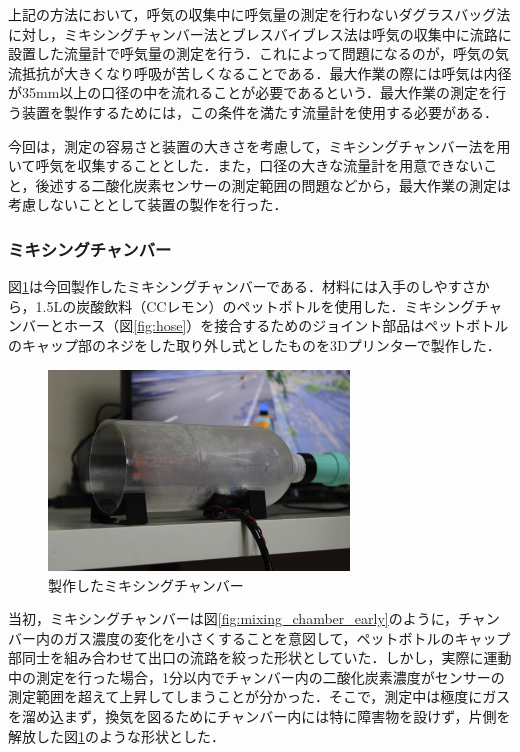 上記の方法において，呼気の収集中に呼気量の測定を行わないダグラスバッグ法に対し，ミキシングチャンバー法とブレスバイブレス法は呼気の収集中に流路に設置した流量計で呼気量の測定を行う．これによって問題になるのが，呼気の気流抵抗が大きくなり呼吸が苦しくなることである．最大作業の際には呼気は内径が35mm以上の口径の中を流れることが必要であるという\cite{science_of_vo2}．最大作業の測定を行う装置を製作するためには，この条件を満たす流量計を使用する必要がある．

今回は，測定の容易さと装置の大きさを考慮して，ミキシングチャンバー法を用いて呼気を収集することとした．また，口径の大きな流量計を用意できないこと，後述する二酸化炭素センサーの測定範囲の問題などから，最大作業の測定は考慮しないこととして装置の製作を行った．

\subsubsection{ミキシングチャンバー}

図\ref{fig:mixing_chamber}は今回製作したミキシングチャンバーである．材料には入手のしやすさから，1.5Lの炭酸飲料（CCレモン）のペットボトルを使用した．ミキシングチャンバーとホース（図\ref{fig:hose}）を接合するためのジョイント部品はペットボトルのキャップ部のネジをした取り外し式としたものを3Dプリンターで製作した．

\begin{figure}[H]
  \begin{center}
    \includegraphics[width=8cm]{fig/mixing_chamber}
    \caption{製作したミキシングチャンバー}
    \label{fig:mixing_chamber}
  \end{center}
\end{figure}

当初，ミキシングチャンバーは図\ref{fig:mixing_chamber_early}のように，チャンバー内のガス濃度の変化を小さくすることを意図して，ペットボトルのキャップ部同士を組み合わせて出口の流路を絞った形状としていた．しかし，実際に運動中の測定を行った場合，1分以内でチャンバー内の二酸化炭素濃度がセンサーの測定範囲を超えて上昇してしまうことが分かった．そこで，測定中は極度にガスを溜め込まず，換気を図るためにチャンバー内には特に障害物を設けず，片側を解放した図\ref{fig:mixing_chamber}のような形状とした．

